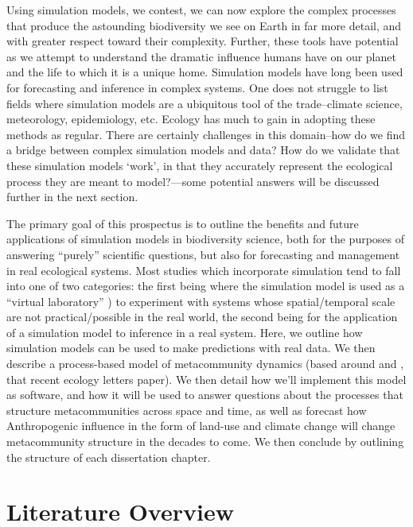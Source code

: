 \documentclass[]{article}
\begin{document}
Using simulation models, we contest, we can now explore the complex
processes that produce the astounding biodiversity we see on Earth in
far more detail, and with greater respect toward their complexity.
Further, these tools have potential as we attempt to understand the
dramatic influence humans have on our planet and the life to which it is
a unique home. Simulation models have long been used for forecasting and
inference in complex systems. One does not struggle to list fields where
simulation models are a ubiquitous tool of the trade--climate science,
meteorology, epidemiology, etc. Ecology has much to gain in adopting
these methods as regular. There are certainly challenges in this
domain--how do we find a bridge between complex simulation models and
data? How do we validate that these simulation models `work', in that
they accurately represent the ecological process they are meant to
model?---some potential answers will be discussed further in the next
section.

The primary goal of this prospectus is to outline the benefits and
future applications of simulation models in biodiversity science, both
for the purposes of answering ``purely'' scientific questions, but also
for forecasting and management in real ecological systems. Most studies
which incorporate simulation tend to fall into one of two categories:
the first being where the simulation model is used as a ``virtual
laboratory'' \citep{volker_grimm_ibm}) to experiment with systems
whose spatial/temporal scale are not practical/possible in the real
world, the second being for the application of a simulation model to
inference in a real system. Here, we outline how simulation models can
be used to make predictions with real data. We then describe a
process-based model of metacommunity dynamics (based around
\cite{poisot_beyond_2015} and \citep{velland_2010}, that recent
ecology letters paper). We then detail how we'll implement this model as
software, and how it will be used to answer questions about the
processes that structure metacommunities across space and time, as well
as forecast how Anthropogenic influence in the form of land-use and
climate change will change metacommunity structure in the decades to
come. We then conclude by outlining the structure of each dissertation
chapter.

\pagebreak


%
%
%
\hypertarget{literature-overview}{%
\section{Literature Overview}\label{literature-overview}}
\end{document}
